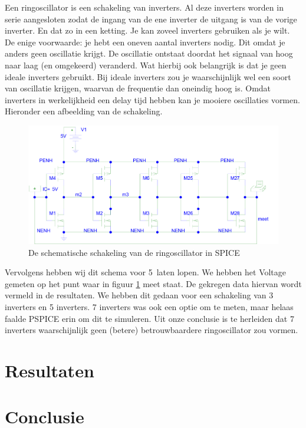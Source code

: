 \documentclass{scrartcl}  %
\begin{document}
Een ringoscillator is een schakeling van inverters. Al deze inverters worden in serie aangesloten zodat de ingang van de ene inverter de uitgang is van de vorige inverter. En dat zo in een ketting. Je kan zoveel inverters gebruiken als je wilt. De enige voorwaarde: je hebt een oneven aantal inverters nodig. Dit omdat je anders geen oscillatie krijgt. De oscillatie ontstaat doordat het signaal van hoog naar laag (en omgekeerd) veranderd. Wat hierbij ook belangrijk is dat je geen ideale inverters gebruikt. Bij ideale inverters zou je waarschijnlijk wel een soort van oscillatie krijgen, waarvan de frequentie dan oneindig hoog is. Omdat inverters in werkelijkheid een delay tijd hebben kan je mooiere oscillaties vormen. Hieronder een afbeelding van de schakeling.
\begin{figure}[H]
\centering
	
	\includegraphics[width=\linewidth]{images/ringoscillator2.png}
	\caption{De schematische schakeling van de ringoscillator in SPICE}
	\label{fig:schema}
\end{figure}
Vervolgens hebben wij dit schema voor 5\nano\second\  laten lopen. We hebben het Voltage gemeten op het punt waar in figuur \ref{fig:schema} meet staat. De gekregen data hiervan wordt vermeld in de resultaten. We hebben dit gedaan voor een schakeling van 3 inverters en 5 inverters. 7 inverters was ook een optie om te meten, maar helaas faalde PSPICE erin om dit te simuleren. Uit onze conclusie is te herleiden dat 7 inverters waarschijnlijk geen (betere) betrouwbaardere ringoscillator zou vormen.

\section{Resultaten}


\section{Conclusie}
\end{document}
